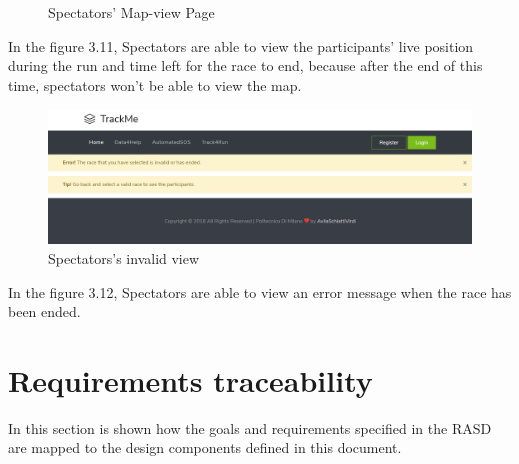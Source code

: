 \documentclass[a4paper, hidelinks, 12pt]{report}
\begin{document}
	
	\begin{figure}[H]
		\centering
		\caption[UI: Spectators' Map-view Page]{Spectators' Map-view Page}
		\label{fig:Spectators' Map-view Page}
	\end{figure}
	
	In the figure 3.11, Spectators are able to view  the participants' live position during the run and time left for the race to end, because after the end of this time, spectators won't be able to view the map.
	
	
	
	
	\begin{figure}[H]
		\centering
		\includegraphics[scale=0.35]{UI/spectator_invalid.png}
		\caption[UI: Spectators's invalid view]{Spectators's invalid view}
		\label{fig:Spectators's invalid view}
	\end{figure}
	
	In the figure 3.12, Spectators are able to view an error message when the race has been ended. 
	
	\chapter{Requirements traceability}
	In this section is shown how the goals and requirements specified in the RASD are mapped to the design components defined in this document.
	
\end{document}
